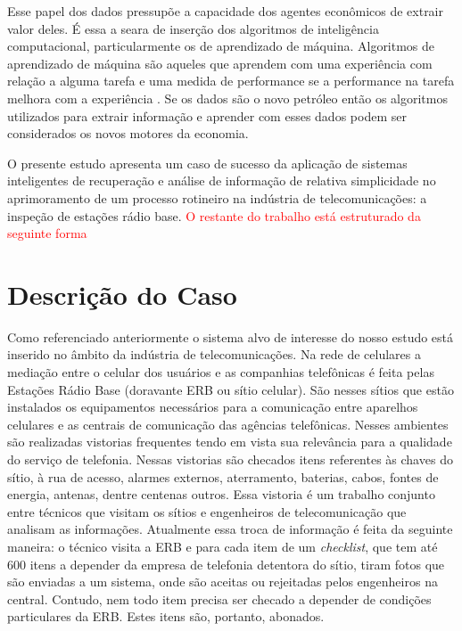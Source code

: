 \documentclass[
	12pt,				%
	openany,			%
	oneside,			%
	a4paper,			%
	english,			%
	french,				%
	spanish,			%
	brazil,				%
	]{abntex2}
\begin{document}
Esse papel dos dados pressupõe a capacidade dos agentes econômicos de extrair
valor deles. É essa a seara de inserção dos algoritmos de inteligência
computacional, particularmente os de aprendizado de máquina. Algoritmos de
aprendizado de máquina são aqueles que aprendem com uma experiência com relação
a alguma tarefa e uma medida de performance se a performance na tarefa melhora
com a experiência \cite{carbonell1984machine}. Se os dados são o novo petróleo
então os algoritmos utilizados para extrair informação e aprender com esses
dados podem ser considerados os novos motores da economia.


O presente estudo apresenta um caso de sucesso da aplicação de sistemas
inteligentes de recuperação e análise de informação de relativa simplicidade no
aprimoramento de um processo rotineiro na indústria de telecomunicações: a
inspeção de estações rádio base. \textcolor{red}{O restante do trabalho está
  estruturado da seguinte forma}

\chapter[Descrição do Caso]{Descrição do Caso}
Como referenciado anteriormente o sistema alvo de interesse do nosso estudo está
inserido no âmbito da indústria de telecomunicações. Na rede de celulares a
mediação entre o celular dos usuários e as companhias telefônicas é feita pelas
Estações Rádio Base (doravante ERB ou sítio celular). São nesses sítios que
estão instalados os equipamentos necessários para a comunicação entre aparelhos
celulares e as centrais de comunicação das agências telefônicas. Nesses
ambientes são realizadas vistorias frequentes tendo em vista sua relevância para
a qualidade do serviço de telefonia. Nessas vistorias são checados itens
referentes às chaves do sítio, à rua de acesso, alarmes externos, aterramento,
baterias, cabos, fontes de energia, antenas, dentre centenas outros. Essa
vistoria é um trabalho conjunto entre técnicos que visitam os sítios e
engenheiros de telecomunicação que analisam as informações. Atualmente essa
troca de informação é feita da seguinte maneira: o técnico visita a ERB e para
cada item de um \textit{checklist}, que tem até 600 itens a depender da
empresa de telefonia detentora do sítio, tiram fotos que são enviadas a um
sistema, onde são aceitas ou rejeitadas pelos engenheiros na central. Contudo,
nem todo item precisa ser checado a depender de condições particulares da ERB.
Estes itens são, portanto, abonados.
\end{document}
